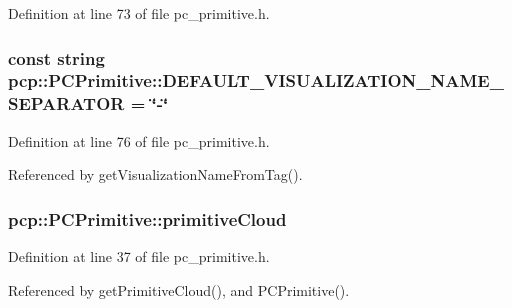 Definition at line 73 of file pc\-\_\-primitive.\-h.

\hypertarget{classpcp_1_1PCPrimitive_a9dc28983a955e1f9b1813a15e4260386}{
\subsubsection[{D\-E\-F\-A\-U\-L\-T\-\_\-\-V\-I\-S\-U\-A\-L\-I\-Z\-A\-T\-I\-O\-N\-\_\-\-N\-A\-M\-E\-\_\-\-S\-E\-P\-A\-R\-A\-T\-O\-R}]{\setlength{\rightskip}{0pt plus 5cm}const string pcp\-::\-P\-C\-Primitive\-::\-D\-E\-F\-A\-U\-L\-T\-\_\-\-V\-I\-S\-U\-A\-L\-I\-Z\-A\-T\-I\-O\-N\-\_\-\-N\-A\-M\-E\-\_\-\-S\-E\-P\-A\-R\-A\-T\-O\-R = \char`\"{}-\/\char`\"{}\hspace{0.3cm}{\ttfamily [static]}}}\label{classpcp_1_1PCPrimitive_a9dc28983a955e1f9b1813a15e4260386}


Definition at line 76 of file pc\-\_\-primitive.\-h.



Referenced by get\-Visualization\-Name\-From\-Tag().

\hypertarget{classpcp_1_1PCPrimitive_accdf8a12234519275d4276b6706d4703}{
\subsubsection[{primitive\-Cloud}]{ pcp\-::\-P\-C\-Primitive\-::primitive\-Cloud\hspace{0.3cm}{\ttfamily [private]}}}\label{classpcp_1_1PCPrimitive_accdf8a12234519275d4276b6706d4703}


Definition at line 37 of file pc\-\_\-primitive.\-h.



Referenced by get\-Primitive\-Cloud(), and P\-C\-Primitive().

